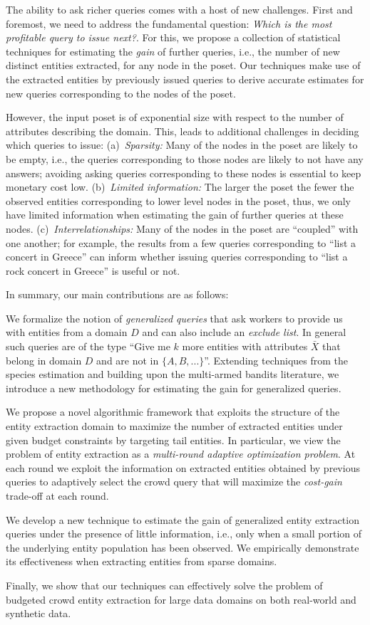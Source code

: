 The ability to ask richer queries comes with a host of new challenges. First and foremost, we need to address the fundamental question: {\em Which is the most profitable query to issue next?}. For this, we propose a collection of  statistical techniques for estimating the {\em gain} of further queries, i.e., the number of new distinct entities extracted, for any node in the poset. Our techniques make use of the extracted entities by previously issued queries to derive accurate estimates for new queries corresponding to the nodes of the poset.  

However, the input poset is of exponential size with respect to the number of attributes describing the domain. This, leads to additional challenges in deciding which queries to issue: (a)~{\em Sparsity:} Many of the nodes in the poset are likely to be empty, i.e., the queries corresponding to those nodes are likely to not have any answers; avoiding asking queries corresponding to these nodes is essential to keep monetary cost low. (b)~{\em Limited information:} The larger the poset the fewer the observed entities corresponding to lower level nodes in the poset, thus, we only have limited information when estimating the gain of further queries at these nodes.  (c)~{\em Interrelationships:} Many of the nodes in the poset are ``coupled'' with one another; for example, the results from a few queries corresponding to ``list a concert in Greece'' can inform whether issuing queries corresponding to ``list a rock concert in Greece'' is useful or not. 

In summary, our main contributions are as follows:
\squishlist
\item We formalize the notion of {\em generalized queries} that ask workers to provide us with entities from a domain $D$ and can also include an {\em exclude list}. In general such queries are of the type ``Give me $k$ more entities with attributes $\bar{X}$ that belong in domain $D$ and are not in $\{A, B, ...\}$''.  Extending techniques from the species estimation and building upon the multi-armed bandits literature, we introduce a new methodology for estimating the gain for generalized queries. 
\item We propose a novel algorithmic framework that exploits the structure of the entity extraction domain to maximize the number of extracted entities under given budget constraints by targeting tail entities. In particular, we view the problem of entity extraction as a {\em multi-round adaptive optimization problem}. At  each round we exploit the information on extracted entities obtained by previous queries to adaptively select the crowd query that will maximize the {\em cost-gain} trade-off at each round. 
\item We develop a new technique to estimate the gain of generalized entity extraction queries under the presence of little information, i.e., only when a small portion of the underlying entity population has been observed. We empirically demonstrate its effectiveness when extracting entities from sparse domains.
\item Finally, we show that our techniques can effectively solve the problem of budgeted crowd entity extraction for large data domains on both real-world and synthetic data.
\squishend

